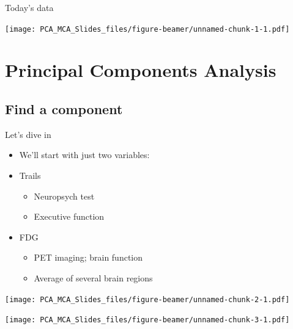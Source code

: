\documentclass[
  ignorenonframetext,
]{beamer}
\providecommand{\tightlist}{%
  \setlength{\itemsep}{0pt}\setlength{\parskip}{0pt}}
\begin{document}
\begin{frame}{Today's data}
\protect\hypertarget{todays-data-1}{}

\texttt{[image: PCA\_MCA\_Slides\_files/figure-beamer/unnamed-chunk-1-1.pdf]}

\end{frame}

\hypertarget{principal-components-analysis}{%
\section{Principal Components
Analysis}\label{principal-components-analysis}}

\hypertarget{find-a-component}{%
\subsection{Find a component}\label{find-a-component}}

\begin{frame}{Let's dive in}
\protect\hypertarget{lets-dive-in}{}

\begin{itemize}[<+->]
\tightlist
\item
  We'll start with just two variables:
\item
  Trails

  \begin{itemize}[<+->]
  \tightlist
  \item
    Neuropsych test
  \item
    Executive function
  \end{itemize}
\item
  FDG

  \begin{itemize}[<+->]
  \tightlist
  \item
    PET imaging; brain function
  \item
    Average of several brain regions
  \end{itemize}
\end{itemize}

\end{frame}

\begin{frame}

\texttt{[image: PCA\_MCA\_Slides\_files/figure-beamer/unnamed-chunk-2-1.pdf]}

\end{frame}

\begin{frame}

\texttt{[image: PCA\_MCA\_Slides\_files/figure-beamer/unnamed-chunk-3-1.pdf]}

\end{frame}
\end{document}
